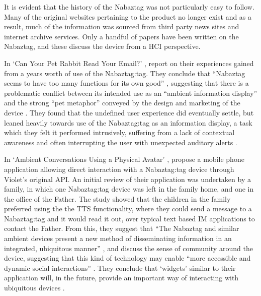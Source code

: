\documentclass[12pt, a4paper]{article}
\begin{document}
	It is evident that the history of the Nabaztag was not particularly easy to follow. Many of the original websites pertaining to the product no longer exist and as a result, much of the information was sourced from third party news sites and internet archive services. Only a handful of papers have been written on the Nabaztag, and these discuss the device from a \ac{HCI} perspective.
	
	In `Can Your Pet Rabbit Read Your Email?' \parencite{Huang2011}, \citeauthor{Huang2011} report on their experiences gained from a years worth of use of the Nabaztag:tag. They conclude that ``Nabaztag seems to have too many functions for its own good'' \parencite{Huang2011}, suggesting that there is a problematic conflict between its intended use as an ``ambient information display'' and the strong ``pet metaphor'' conveyed by the design and marketing of the device \parencite{Huang2011}. They found that the undefined user experience did eventually settle, but leaned heavily towards use of the Nabaztag:tag as an information display, a task which they felt it performed intrusively, suffering from a lack of contextual awareness and often interrupting the user with unexpected auditory alerts \parencite{Huang2011}.
	
	In `Ambient Conversations Using a Physical Avatar' \parencite{Lund2009}, \citeauthor{Lund2009} propose a mobile phone application allowing direct interaction with a Nabaztag:tag device through Violet's original \ac{API}. An initial review of their application was undertaken by a family, in which one Nabaztag:tag device was left in the family home, and one in the office of the Father. The study showed that the children in the family preferred using the the \ac{TTS} functionality, where they could send a message to a Nabaztag:tag and it would read it out, over typical text based \ac{IM} applications to contact the Father. From this, they suggest that ``The Nabaztag and similar ambient devices present a new method of disseminating information in an integrated, ubiquitous manner'' \parencite{Lund2009}, and discuss the sense of community around the device, suggesting that this kind of technology may enable ``more accessible and dynamic social interactions'' \parencite{Lund2009}. They conclude that `widgets' similar to their application will, in the future, provide an important way of interacting with ubiquitous devices \parencite{Lund2009}.
	
\end{document}
